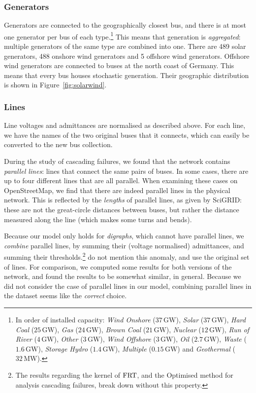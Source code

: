 \documentclass[main.tex]{subfiles}
\begin{document}
\subsubsection{Generators}
Generators are connected to the geographically closest bus, and there is at most one generator per bus of each type.\footnote{In order of installed capacity: \emph{Wind Onshore} ($37\,\si{\giga\watt}$), \emph{Solar} ($37\,\si{\giga\watt}$), \emph{Hard Coal} ($25\,\si{\giga\watt}$), \emph{Gas} ($24\,\si{\giga\watt}$), \emph{Brown Coal} ($21\,\si{\giga\watt}$), \emph{Nuclear} ($12\,\si{\giga\watt}$), \emph{Run of River} ($4\,\si{\giga\watt}$), \emph{Other} ($3\,\si{\giga\watt}$), \emph{Wind Offshore} ($3\,\si{\giga\watt}$), \emph{Oil} ($2.7\,\si{\giga\watt}$), \emph{Waste} ($1.6\,\si{\giga\watt}$), \emph{Storage Hydro} ($1.4\,\si{\giga\watt}$), \emph{Multiple} ($0.15\,\si{\giga\watt}$) and \emph{Geothermal} ($32\,\si{\mega\watt}$).} This means that generation is \emph{aggregated}: multiple generators of the same type are combined into one. There are 489 solar generators, 488 onshore wind generators and 5 offshore wind generators. Offshore wind generators are connected to buses at the north coast of Germany. This means that every bus houses stochastic generation. Their geographic distribution is shown in Figure~\ref{fig:solarwind}.

\subsubsection{Lines}
Line voltages and admittances are normalised as described above. For each line, we have the names of the two original buses that it connects, which can easily be converted to the new bus collection.

During the study of cascading failures, we found that the network contains \emph{parallel lines}: lines that connect the same pairs of buses. In some cases, there are up to four different lines that are all parallel. When examining these cases on OpenStreetMap, we find that there are indeed parallel lines in the physical network. This is reflected by the \emph{lengths} of parallel lines, as given by SciGRID: these are not the great-circle distances between buses, but rather the distance measured along the line (which makes some turns and bends).

Because our model only holds for \emph{digraphs}, which cannot have parallel lines, we \emph{combine} parallel lines, by summing their (voltage normalised) admittances, and summing their thresholds.\footnote{The results regarding the kernel of $\text{\textup{FRT}}$, and the Optimised method for analysis cascading failures, break down without this property.} \cite{Nesti2018emergentfailures} do not mention this anomaly, and use the original set of lines. For comparison, we computed some results for both versions of the network, and found the results to be somewhat similar, in general. Because we did not consider the case of parallel lines in our model, combining parallel lines in the dataset seems like the \emph{correct} choice.
\end{document}
